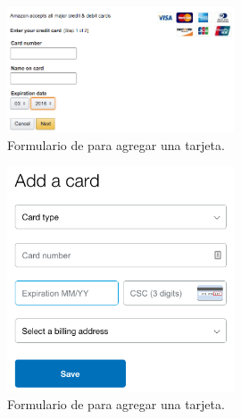 
\begin{figure}[H]
	\centering
	\includegraphics[width=0.6\textwidth]{figuras/creditCard/examples/amazon_add_card.png}
	\caption{Formulario de \amazonNAME para agregar una tarjeta.}
	\label{figure:apendice:creditCard:example:amazon_add_card}
\end{figure}

\begin{figure}[H]
	\centering
	\includegraphics[width=0.6\textwidth]{figuras/creditCard/examples/paypal_add_card.png}
	\caption{Formulario de \paypalNAME para agregar una tarjeta.}
	\label{figure:apendice:creditCard:example:paypal_add_card}
\end{figure}